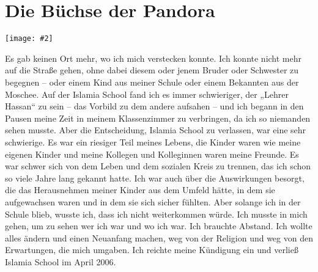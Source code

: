 \documentclass[12pt]{memoir}
\newcommand{\img}[3]{\begin{center}%
\texttt{[image: \#2]}\\{\small\em#3}%
\end{center}}
\begin{document}
\chapter{Die Büchse der Pandora}

\img{scale=0.5}{Pandoras_Box.jpg}{}

Es gab keinen Ort mehr, wo ich mich verstecken konnte.
Ich konnte nicht mehr auf die Straße gehen,
ohne dabei diesem oder jenem Bruder oder Schwester zu begegnen –
oder einem Kind aus meiner Schule oder einem Bekannten aus der Moschee.
Auf der Islamia School fand ich es immer schwieriger,
der „Lehrer Hassan“ zu sein – das Vorbild zu dem andere aufsahen –
und ich begann in den Pausen meine Zeit in meinem Klassenzimmer zu verbringen,
da ich so niemanden sehen musste.
Aber die Entscheidung, Islamia School zu verlassen, war eine sehr schwierige.
Es war ein riesiger Teil meines Lebens,
die Kinder waren wie meine eigenen Kinder
und meine Kollegen und Kolleginnen waren meine Freunde.
Es war schwer sich von dem Leben und dem sozialen Kreis zu trennen,
das ich schon so viele Jahre lang gekannt hatte.
Ich war auch über die Auswirkungen besorgt,
die das Herausnehmen meiner Kinder aus dem Umfeld hätte,
in dem sie aufgewachsen waren und in dem sie sich sicher fühlten.
Aber solange ich in der Schule blieb, wusste ich,
dass ich nicht weiterkommen würde.
Ich musste in mich gehen, um zu sehen wer ich war und wo ich war.
Ich brauchte Abstand.
Ich wollte alles ändern und einen Neuanfang machen,
weg von der Religion und weg von den Erwartungen, die mich umgaben.
Ich reichte meine Kündigung ein und verließ Islamia School im April 2006.
\end{document}
